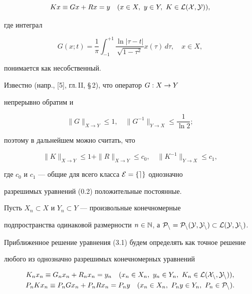 \begin{equation}


Kx\equiv Gx+Rx=y\quad (x\in X,\ y\in Y,\ K\in\cal L(X,Y)),


\end{equation}


где интеграл


$$


G(x;t)=\frac{1}{\pi}\int_{-1}^{+1}\frac{\ln |\tau -t|}{\sqrt{1-\tau^2}}


x(\tau)\, d\tau ,\quad x\in X,


$$


понимается как несобственный.





Известно (напр., [5], гл.\,II, \S\,2), что оператор $G : X \to Y$


непрерывно обратим и


$$


\|G\|_{X\rightarrow Y}\leq 1,\quad


\|G^{-1}\|_{Y\rightarrow X}\leq \frac{1}{\ln 2};


$$


поэтому в дальнейшем можно считать, что


\begin{equation}


\|K\|_{X\rightarrow Y}\leq 1+\|R\|_{X\rightarrow Y}\leq c_0,\quad


\|K^{-1}\|_{Y\rightarrow X}\leq c_1,


\end{equation}


где $c_0$ и $c_1$ --- общие для всего класса $\cal E=\{ e\}$ однозначно


разрешимых уравнений (0.2) положительные постоянные.





Пусть $X_n\subset X$ и $Y_n\subset Y$ --- произвольные конечномерные


подпространства одинаковой размерности $n\in \Bbb N$, а $\cal P_n=


\cal P_n(Y,Y_n)\subset \cal L(Y,Y_n)$.





Приближенное решение уравнения (3.1) будем определять как точное решение


любого из однозначно разрешимых конечномерных уравнений


\begin{gather}


K_nx_n\equiv G_nx_n+R_nx_n=y_n\quad (x_n\in X_n,\ y_n\in Y_n,\


K_n\in\cal L(X_n,Y_n)), \\


%


P_nKx_n\equiv P_nGx_n+P_nRx_n=P_ny\quad (x_n\in X_n,\ P_ny\in Y_n,\


P_n\in\cal P_n).


\end{gather}



